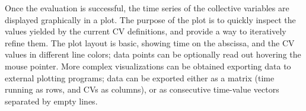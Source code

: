 \documentclass[preprint,12pt]{elsarticle}
\begin{document}
Once the evaluation is successful, the time series of the collective
variables are displayed graphically in a plot.  The purpose of the
plot is to quickly inspect the values yielded by the current CV
definitions, and provide a way to iteratively refine them. The plot
layout is basic, showing time on the abscissa, and the CV values in
different line colors; data points can be optionally read out hovering the
mouse pointer.  More complex visualizations can be obtained exporting
data to external plotting programs; data can be exported 
either as a matrix (time running as rows, and CVs as
columns), or as consecutive time-value vectors separated by empty
lines.




\begin{figure}
  \centering

\end{figure}
\end{document}
